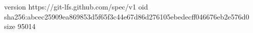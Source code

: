 version https://git-lfs.github.com/spec/v1
oid sha256:abcec25909ea869853d5f65f3c44e67d86d276105ebedecff046676eb2e576d0
size 95014
